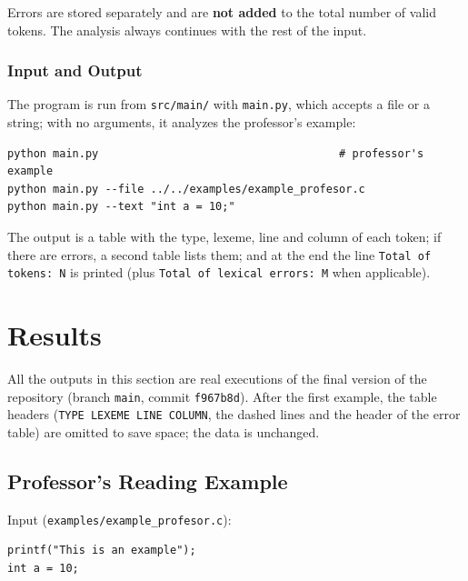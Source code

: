 \documentclass[11pt,letterpaper]{article}
\newcommand{\tok}[1]{\texttt{#1}}
\begin{document}
Errors are stored separately and are \textbf{not added} to the total number
of valid tokens. The analysis always continues with the rest of the input.

\subsubsection{Input and Output}

The program is run from \tok{src/main/} with \tok{main.py}, which accepts a
file or a string; with no arguments, it analyzes the professor's example:

\par\noindent\begin{minipage}{\linewidth}
\begin{lstlisting}[style=console]
python main.py                                     # professor's example
python main.py --file ../../examples/example_profesor.c
python main.py --text "int a = 10;"
\end{lstlisting}
\end{minipage}\par\smallskip

The output is a table with the type, lexeme, line and column of each token;
if there are errors, a second table lists them; and at the end the line
\tok{Total of tokens: N} is printed (plus \tok{Total of lexical errors: M} when
applicable).

\section{Results}
\label{sec:res}

All the outputs in this section are real executions of the final version of
the repository \cite{repo} (branch \tok{main}, commit \tok{f967b8d}). After
the first example, the table headers (\tok{TYPE LEXEME LINE COLUMN}, the
dashed lines and the header of the error table) are omitted to save space;
the data is unchanged.

\subsection{Professor's Reading Example}

\par\noindent\begin{minipage}{\linewidth}
Input (\tok{examples/example\_profesor.c}):\par\smallskip
\begin{lstlisting}[style=console]
printf("This is an example");
int a = 10;
\end{lstlisting}
\end{minipage}\par\smallskip
\end{document}
